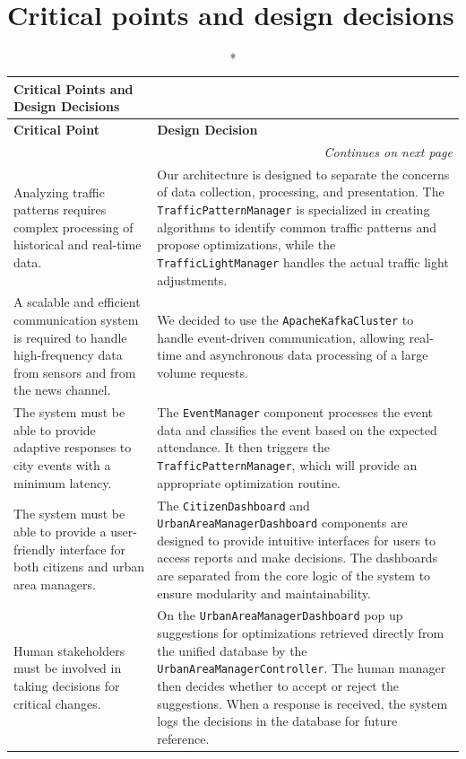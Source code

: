 \documentclass[12pt, a4paper, twoside, openright]{report}
\begin{document}
\section{Critical points and design decisions}
\begin{longtable}{p{}p{}}
\caption*{Critical Points and Design Decisions} \\
\toprule
\textbf{Critical Point} & \textbf{Design Decision} \\
\midrule
\endhead
\midrule
\multicolumn{2}{r}{\textit{Continues on next page}} \\
\endfoot
\bottomrule
\endlastfoot
Analyzing traffic patterns requires complex processing of historical and real-time data. & Our architecture is designed to separate the concerns of data collection, processing, and presentation. The \texttt{TrafficPatternManager} is specialized in creating algorithms to identify common traffic patterns and propose optimizations, while the \texttt{TrafficLightManager} handles the actual traffic light adjustments. \\
\hline
A scalable and efficient communication system is required to handle high-frequency data from sensors and from the news channel. & We decided to use the \texttt{ApacheKafkaCluster} to handle event-driven communication, allowing real-time and asynchronous data processing of a large volume requests. \\
\hline
The system must be able to provide adaptive responses to city events with a minimum latency. & The \texttt{EventManager} component processes the event data and classifies the event based on the expected attendance. It then triggers the \texttt{TrafficPatternManager}, which will provide an appropriate optimization routine. \\
\hline
The system must be able to provide a user-friendly interface for both citizens and urban area managers. & The \texttt{CitizenDashboard} and \texttt{UrbanAreaManagerDashboard} components are designed to provide intuitive interfaces for users to access reports and make decisions. The dashboards are separated from the core logic of the system to ensure modularity and maintainability. \\
\hline
Human stakeholders must be involved in taking decisions for critical changes. & On the \texttt{UrbanAreaManagerDashboard} pop up suggestions for optimizations retrieved directly from the unified database by the \texttt{UrbanAreaManagerController}. The human manager then decides whether to accept or reject the suggestions. When a response is received, the system logs the decisions in the database for future reference. \\

\end{longtable}
\end{document}
